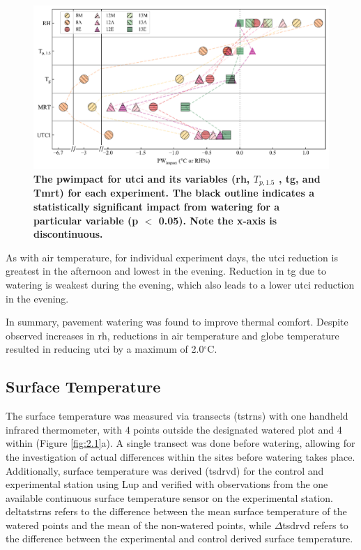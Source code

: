 \documentclass[final,3p,times,authoryear]{elsarticle}
\begin{document}
\begin{figure}
\centering
\includegraphics[trim={0 0 0 0},clip,scale=1.0]{pict015.png}
\caption{\bf The \gls{pwimpact} for \gls{utci} and its variables (\gls{rh}, $T_{p,1.5}$ , \gls{tg}, and \gls{Tmrt}) for each experiment. The black outline indicates a statistically significant impact from watering for a particular variable (\gls{p} $<$ 0.05). Note the x-axis is discontinuous.}
 \label{fig:3.4}
\end{figure}

As with air temperature, for individual experiment days, the \gls{utci} reduction is greatest in the afternoon and lowest in the evening. Reduction in \gls{tg} due to watering is weakest during the evening, which also leads to a lower \gls{utci} reduction in the evening. 

In summary, pavement watering was found to improve thermal comfort. Despite observed increases in \gls{rh}, reductions in air temperature and globe temperature resulted
in reducing \gls{utci} by a maximum of 2.0$^{\circ}$C.

\subsection{Surface Temperature}\label{sec:discussion3.3}

The surface temperature was measured via transects (\gls{tstrns}) with one handheld infrared
thermometer, with 4 points outside the designated watered plot and 4 within (Figure
\ref{fig:2.1}a). A single transect was done before watering, allowing for the investigation of actual differences within the sites before watering takes place. Additionally, surface
temperature was derived (\gls{tsdrvd}) for the control and experimental station using \gls{Lup} and verified with observations from the one available continuous surface temperature sensor on the experimental station. \gls{deltatstrns} refers to the difference between the mean surface temperature of the watered points and the mean of the non-watered points, while $\Delta$\gls{tsdrvd} refers to the difference between the experimental and control derived surface temperature.
\end{document}
